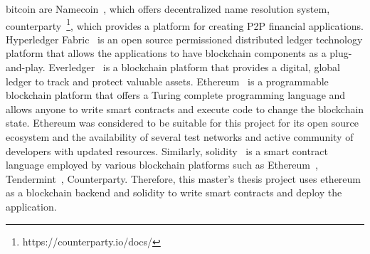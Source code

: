 bitcoin are Namecoin~\cite{kalodner2015empirical}, which offers decentralized
name resolution system, counterparty~\footnote{https://counterparty.io/docs/},
which provides a platform for creating P2P financial applications. Hyperledger
Fabric~\cite{cachin2016architecture} is an open source permissioned distributed
ledger technology platform that allows the applications to have blockchain
components as a plug-and-play.  Everledger~\cite{lomas2015everledger} is a
blockchain platform that provides a digital, global ledger to track and protect
valuable assets. Ethereum~\cite{wood2014ethereum} is a programmable blockchain
platform that offers a Turing complete programming language and allows anyone
to write smart contracts and execute code to change the blockchain state.
Ethereum was considered to be suitable for this project for its open source
ecosystem and the availability of several test networks and active community of
developers with updated resources. Similarly, solidity~\cite{SolidityDocs} is a
smart contract language employed by various blockchain platforms such as
Ethereum~\cite{wood2014ethereum}, Tendermint~\cite{TendermintDocs},
Counterparty. Therefore, this master's thesis project uses ethereum as a
blockchain backend and solidity to write smart contracts and deploy the
application. 

%


